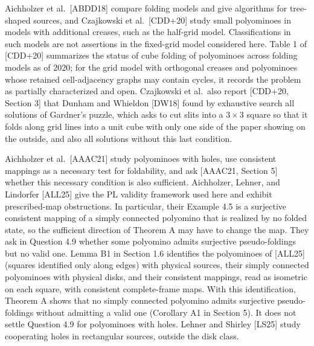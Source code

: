 \documentclass[
  11pt,
]{article}
\begin{document}
Aichholzer et al.~{[}ABDD18{]} compare folding models and give
algorithms for tree-shaped sources, and Czajkowski et al.~{[}CDD+20{]}
study small polyominoes in models with additional creases, such as the
half-grid model. Classifications in such models are not assertions in
the fixed-grid model considered here. Table 1 of {[}CDD+20{]} summarizes
the status of cube folding of polyominoes across folding models as of
2020; for the grid model with orthogonal creases and polyominoes whose
retained cell-adjacency graphs may contain cycles, it records the
problem as partially characterized and open. Czajkowski et al.~also
report {[}CDD+20, Section 3{]} that Dunham and Whieldon {[}DW18{]} found
by exhaustive search all solutions of Gardner's puzzle, which asks to
cut slits into a \(3\times3\) square so that it folds along grid lines
into a unit cube with only one side of the paper showing on the outside,
and also all solutions without this last condition.

Aichholzer et al.~{[}AAAC21{]} study polyominoes with holes, use
consistent mappings as a necessary test for foldability, and ask
{[}AAAC21, Section 5{]} whether this necessary condition is also
sufficient. Aichholzer, Lehner, and Lindorfer {[}ALL25{]} give the PL
validity framework used here and exhibit prescribed-map obstructions. In
particular, their Example 4.5 is a surjective consistent mapping of a
simply connected polyomino that is realized by no folded state, so the
sufficient direction of Theorem A may have to change the map. They ask
in Question 4.9 whether some polyomino admits surjective pseudo-foldings
but no valid one. Lemma B1 in Section 1.6 identifies the polyominoes of
{[}ALL25{]} (squares identified only along edges) with physical sources,
their simply connected polyominoes with physical disks, and their
consistent mappings, read as isometric on each square, with consistent
complete-frame maps. With this identification, Theorem A shows that no
simply connected polyomino admits surjective pseudo-foldings without
admitting a valid one (Corollary A1 in Section 5). It does not settle
Question 4.9 for polyominoes with holes. Lehner and Shirley {[}LS25{]}
study cooperating holes in rectangular sources, outside the disk class.
\end{document}
